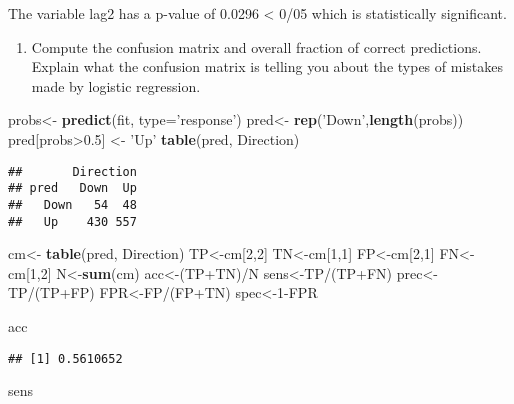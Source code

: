 \documentclass[]{article}
\newenvironment{Shaded}{\begin{snugshade}}{\end{snugshade}}
\newcommand{\KeywordTok}[1]{\textcolor[rgb]{0.13,0.29,0.53}{\textbf{{#1}}}}
\newcommand{\DataTypeTok}[1]{\textcolor[rgb]{0.13,0.29,0.53}{{#1}}}
\newcommand{\DecValTok}[1]{\textcolor[rgb]{0.00,0.00,0.81}{{#1}}}
\newcommand{\FloatTok}[1]{\textcolor[rgb]{0.00,0.00,0.81}{{#1}}}
\newcommand{\StringTok}[1]{\textcolor[rgb]{0.31,0.60,0.02}{{#1}}}
\newcommand{\NormalTok}[1]{{#1}}
\providecommand{\tightlist}{%
  \setlength{\itemsep}{0pt}\setlength{\parskip}{0pt}}
\begin{document}
The variable lag2 has a p-value of 0.0296 \textless{} 0/05 which is
statistically significant.

\begin{enumerate}
\def\labelenumi{(\alph{enumi})}
\setcounter{enumi}{2}
\tightlist
\item
  Compute the confusion matrix and overall fraction of correct
  predictions. Explain what the confusion matrix is telling you about
  the types of mistakes made by logistic regression.
\end{enumerate}

\begin{Shaded}
\begin{Highlighting}[]
\NormalTok{probs<-}\StringTok{ }\KeywordTok{predict}\NormalTok{(fit, }\DataTypeTok{type=}\StringTok{'response'}\NormalTok{)}
\NormalTok{pred<-}\StringTok{ }\KeywordTok{rep}\NormalTok{(}\StringTok{'Down'}\NormalTok{,}\KeywordTok{length}\NormalTok{(probs))}
\NormalTok{pred[probs>}\FloatTok{0.5}\NormalTok{] <-}\StringTok{ 'Up'}
\KeywordTok{table}\NormalTok{(pred, Direction)}
\end{Highlighting}
\end{Shaded}

\begin{verbatim}
##       Direction
## pred   Down  Up
##   Down   54  48
##   Up    430 557
\end{verbatim}

\begin{Shaded}
\begin{Highlighting}[]
  \NormalTok{cm<-}\StringTok{ }\KeywordTok{table}\NormalTok{(pred, Direction)}
  \NormalTok{TP<-cm[}\DecValTok{2}\NormalTok{,}\DecValTok{2}\NormalTok{]}
  \NormalTok{TN<-cm[}\DecValTok{1}\NormalTok{,}\DecValTok{1}\NormalTok{]}
  \NormalTok{FP<-cm[}\DecValTok{2}\NormalTok{,}\DecValTok{1}\NormalTok{]}
  \NormalTok{FN<-cm[}\DecValTok{1}\NormalTok{,}\DecValTok{2}\NormalTok{]}
  \NormalTok{N<-}\KeywordTok{sum}\NormalTok{(cm)}
  \NormalTok{acc<-(TP+TN)/N}
  \NormalTok{sens<-TP/(TP+FN)}
  \NormalTok{prec<-TP/(TP+FP)}
  \NormalTok{FPR<-FP/(FP+TN)}
  \NormalTok{spec<-}\DecValTok{1}\NormalTok{-FPR}
  
  \NormalTok{acc}
\end{Highlighting}
\end{Shaded}

\begin{verbatim}
## [1] 0.5610652
\end{verbatim}

\begin{Shaded}
\begin{Highlighting}[]
  \NormalTok{sens}
\end{Highlighting}
\end{Shaded}
\end{document}
